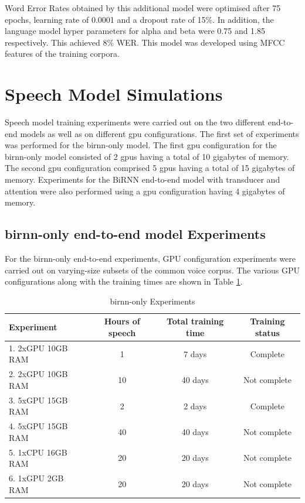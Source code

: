 {Word Error Rates obtained by this additional model were optimised after 75 epochs, learning rate of 0.0001 and a dropout rate of 15\%.  In addition, the language model hyper parameters for alpha and beta were 0.75 and 1.85 respectively.  This achieved 8\% WER. This model was developed using MFCC features of the training corpora.

\section{Speech Model Simulations}

Speech model training experiments were carried out on the two different end-to-end models as well as on different \acrshort{gpu} configurations. The first set of experiments was performed for the \acrshort{birnn}-only model.  The first \acrshort{gpu} configuration for the \acrshort{birnn}-only model consisted of 2 \acrshort{gpu}s having a total of 10 gigabytes of memory. The second \acrshort{gpu} configuration comprised 5 \acrshort{gpu}s having a total of 15 gigabytes of memory. Experiments for the BiRNN end-to-end model with transducer and attention were also performed using a \acrshort{gpu} configuration having 4 gigabytes of memory. 

\subsection{\acrshort{birnn}-only end-to-end model Experiments}
For the \acrshort{birnn}-only end-to-end experiments, GPU configuration experiments were carried out on varying-size subsets of the common voice corpus.   The various GPU configurations along with the training times are shown in Table \ref{tab_c6_01_training}.

\begin{table}
  \caption{\acrshort{birnn}-only Experiments}
  \label{tab_c6_01_training}
\begin{tabular}{lccc}
\toprule
Experiment & Hours of speech & Total training time & Training status\\
\midrule
1. 2xGPU 10GB RAM & 1 & 7 days & Complete\\
2. 2xGPU 10GB RAM & 10 & 40 days & Not complete\\
3. 5xGPU 15GB RAM & 2 & 2 days & Complete\\
4. 5xGPU 15GB RAM & 40 & 40 days & Not complete\\
5. 1xCPU 16GB RAM & 20 & 20 days & Not complete\\
6. 1xGPU 2GB RAM & 20 & 20 days & Not complete\\
\bottomrule
\end{tabular}
\end{table}

}
